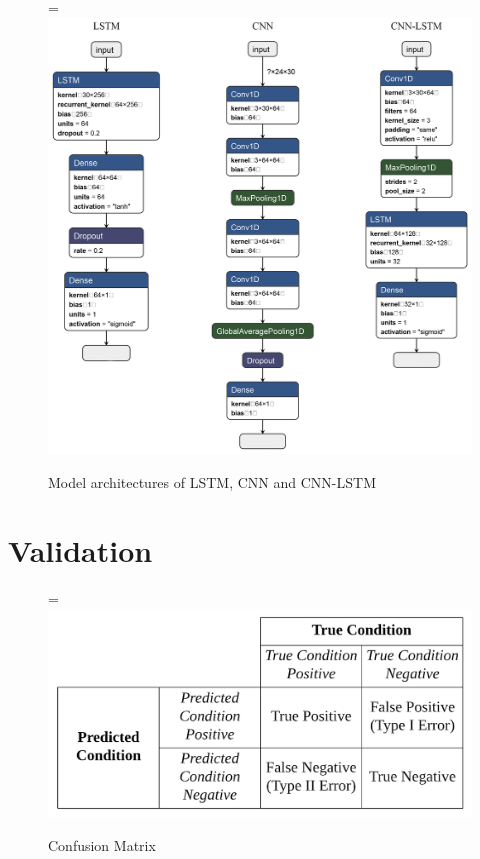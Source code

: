 \documentclass[12pt,oneandhalf,chaparabic,lfm,phd,eng,oneside,pntc]{gsufbe}
\makeatletter
\let\old@includegraphics\includegraphics
\renewcommand{\includegraphics}[2][,]{%
  \setbox9=\hbox{\old@includegraphics[#1]{#2}}%
  \ifdim\wd9>\textwidth
    \old@includegraphics[#1,width=\textwidth]{#2}%
  \else
    \old@includegraphics[#1]{#2}%
  \fi%
}
\makeatother
\begin{document}
\begin{figure}[t]\vspace*{4pt}
\centerline{\includegraphics[width=160mm]{graphics/All_model_architectures.png}}
\caption{Model architectures of LSTM, CNN and CNN-LSTM}
\label{fig:All Models}
\end{figure}


\section{Validation}
\label{sec:Validation}

\begin{figure}[t]\vspace*{4pt}
\centerline{\includegraphics[width=120mm]{graphics/ConfusionMatrix.png}}
\caption{Confusion Matrix}
\label{fig:Confusion Matrix}
\end{figure}
\end{document}
